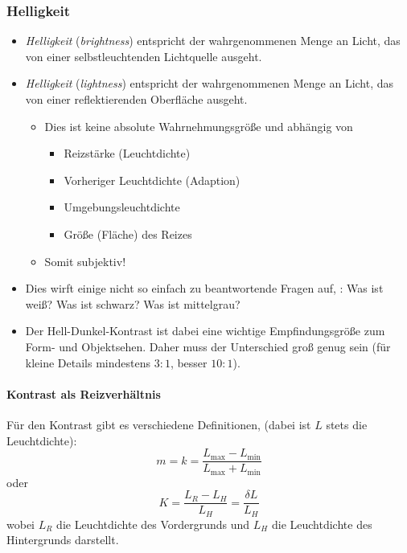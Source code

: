 			\subsubsection{Helligkeit}
				\begin{itemize}
					\item \emph{Helligkeit} (\emph{brightness}) entspricht der wahrgenommenen Menge an Licht, das von einer selbstleuchtenden Lichtquelle ausgeht.
					\item \emph{Helligkeit} (\emph{lightness}) entspricht der wahrgenommenen Menge an Licht, das von einer reflektierenden Oberfläche ausgeht.
						\begin{itemize}
							\item Dies ist keine absolute Wahrnehmungsgröße und abhängig von
								\begin{itemize}
									\item Reizstärke (Leuchtdichte)
									\item Vorheriger Leuchtdichte (Adaption)
									\item Umgebungsleuchtdichte
									\item Größe (Fläche) des Reizes
								\end{itemize}
							\item Somit subjektiv!
						\end{itemize}
					\item Dies wirft einige nicht so einfach zu beantwortende Fragen auf, \zB: Was ist weiß? Was ist schwarz? Was ist mittelgrau?
					\item Der Hell-Dunkel-Kontrast ist dabei eine wichtige Empfindungsgröße zum Form- und Objektsehen. Daher muss der Unterschied groß genug sein (für kleine Details mindestens \(3:1\), besser \(10:1\)).
				\end{itemize}

				\paragraph{Kontrast als Reizverhältnis}
					Für den Kontrast gibt es verschiedene Definitionen, \zB (dabei ist \(L\) stets die Leuchtdichte):
					\begin{equation*}
						m = k = \frac{L_\text{max} - L_\text{min}}{L_\text{max} + L_\text{min}}
					\end{equation*}
					oder
					\begin{equation*}
						K = \frac{L_R - L_H}{L_H} = \frac{\delta L}{L_H}
					\end{equation*}
					wobei \( L_R \) die Leuchtdichte des Vordergrunds und \(L_H\) die Leuchtdichte des Hintergrunds darstellt.
					
